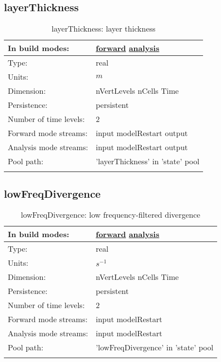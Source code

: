 \subsection[layerThickness]{layerThickness}
\label{subsec:var_sec_state_layerThickness}
\begin{center}
\begin{longtable}{| p{2.0in} | p{4.0in} |}
        \hline 
        In build modes: & \hyperref[subsec:forward_var_tab_state]{forward} \hyperref[subsec:analysis_var_tab_state]{analysis} \\
        \hline 
        Type: & real \\
        \hline 
        Units: & $m$ \\
        \hline 
        Dimension: & nVertLevels nCells Time \\
        \hline 
        Persistence: & persistent \\
        \hline 
        Number of time levels: & 2 \\
        \hline 
		 Forward mode streams: &  input modelRestart output \\
        \hline 
		 Analysis mode streams: &  input modelRestart output \\
        \hline 
            Pool path: & 'layerThickness' in 'state' pool
 \\
		 \hline 
    \caption{layerThickness: layer thickness}
\end{longtable}
\end{center}
\subsection[lowFreqDivergence]{lowFreqDivergence}
\label{subsec:var_sec_state_lowFreqDivergence}
\begin{center}
\begin{longtable}{| p{2.0in} | p{4.0in} |}
        \hline 
        In build modes: & \hyperref[subsec:forward_var_tab_state]{forward} \hyperref[subsec:analysis_var_tab_state]{analysis} \\
        \hline 
        Type: & real \\
        \hline 
        Units: & $s^{-1}$ \\
        \hline 
        Dimension: & nVertLevels nCells Time \\
        \hline 
        Persistence: & persistent \\
        \hline 
        Number of time levels: & 2 \\
        \hline 
		 Forward mode streams: &  input modelRestart \\
        \hline 
		 Analysis mode streams: &  input modelRestart \\
        \hline 
            Pool path: & 'lowFreqDivergence' in 'state' pool
 \\
		 \hline 
    \caption{lowFreqDivergence: low frequency-filtered divergence}
\end{longtable}
\end{center}
